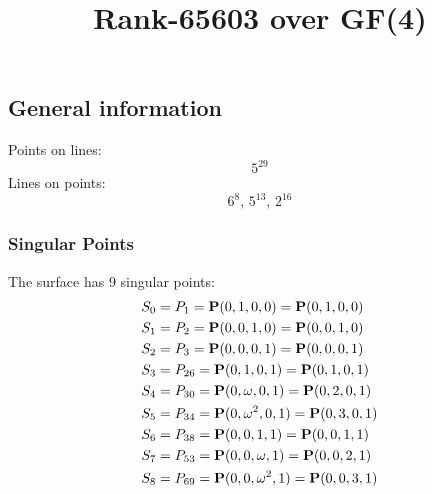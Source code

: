 \documentclass{article}
\newcommand\setTBstruts{\def\T{\rule{0pt}{2.6ex}}%
\def\B{\rule[-1.2ex]{0pt}{0pt}}}
\newcommand{\bP}{{\bf P}}
\begin{document}
 
\setTBstruts



{\allowdisplaybreaks%






\title{Rank-65603 over GF(4)}
\author{}%
\maketitle%
%
{}



\subsection*{General information}
Points on lines:
$$
5^{29}$$
Lines on points:
$$
6^8,\,5^{13},\,2^{16}$$
\subsubsection*{Singular Points}
The surface has 9 singular points:\\
\begin{align*}
S_{0} &= P_{1}=\bP(0, 1, 0, 0) = \bP(0, 1, 0, 0)\\
S_{1} &= P_{2}=\bP(0, 0, 1, 0) = \bP(0, 0, 1, 0)\\
S_{2} &= P_{3}=\bP(0, 0, 0, 1) = \bP(0, 0, 0, 1)\\
S_{3} &= P_{26}=\bP(0, 1, 0, 1) = \bP(0, 1, 0, 1)\\
S_{4} &= P_{30}=\bP(0, \omega , 0, 1) = \bP(0, 2, 0, 1)\\
S_{5} &= P_{34}=\bP(0, \omega^{2}, 0, 1) = \bP(0, 3, 0, 1)\\
S_{6} &= P_{38}=\bP(0, 0, 1, 1) = \bP(0, 0, 1, 1)\\
S_{7} &= P_{53}=\bP(0, 0, \omega , 1) = \bP(0, 0, 2, 1)\\
S_{8} &= P_{69}=\bP(0, 0, \omega^{2}, 1) = \bP(0, 0, 3, 1)\\
\end{align*}
}
\end{document}
